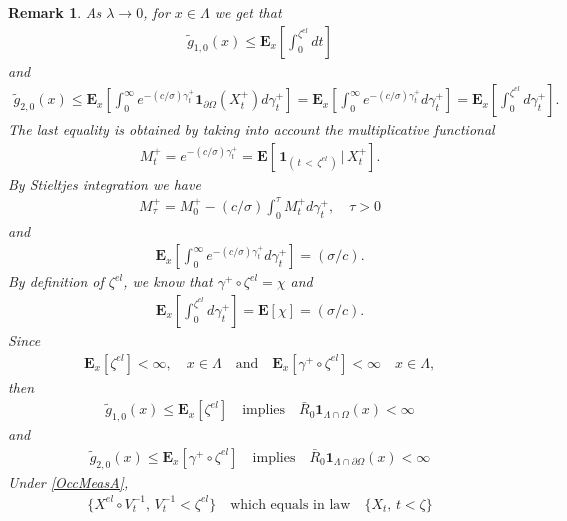 \documentclass[11pt,a4paper]{article}
\newtheorem{remark}{Remark}[section]
\begin{document}
\begin{remark}
As $\lambda \to 0$, for $x \in \Lambda$ we get that
\begin{align*}
\tilde{g}_{1, 0}(x) \leq \mathbf{E}_x \left[ \int_0^{\zeta^{el}} dt \right]
\end{align*}
and
\begin{align*}
\tilde{g}_{2, 0}(x) \leq \mathbf{E}_x\left[ \int_0^\infty e^{-(c/\sigma)\gamma^+_t} \mathbf{1}_{\partial \Omega} (X^+_t) d\gamma^+_t \right] = \mathbf{E}_x\left[ \int_0^\infty e^{-(c/\sigma)\gamma^+_t} d\gamma^+_t \right]  = \mathbf{E}_x\left[ \int_0^{\zeta^{el}} d\gamma^+_t \right].
\end{align*}
The last equality is obtained by taking into account the multiplicative functional 
\begin{align*}
M^+_t= e^{-(c/\sigma)\gamma^+_t} = \mathbf{E}[\, \mathbf{1}_{(\,t\, <\, \zeta^{el}\,)} \,| \, X^+_t].
\end{align*}
By Stieltjes integration we have
\begin{align*}
M^+_\tau = M^+_0 - (c/\sigma) \int_0^\tau M^+_t d\gamma^+_t, \quad \tau >0
\end{align*} 
and
\begin{align*}
\mathbf{E}_x\left[ \int_0^\infty e^{-(c/\sigma)\gamma^+_t} d\gamma^+_t \right] = (\sigma / c).
\end{align*} 
By definition of $\zeta^{el}$, we know that $\gamma^+ \circ \zeta^{el} = \chi$ and 
\begin{align*}
\mathbf{E}_x\left[ \int_0^{\zeta^{el}} d\gamma^+_t \right] = \mathbf{E}[\chi] = (\sigma/c).
\end{align*}
Since
\begin{align}
\mathbf{E}_x[\zeta^{el}] < \infty, \quad x \in \Lambda  \quad \textrm{and} \quad \mathbf{E}_x[\gamma^+ \circ \zeta^{el}] < \infty \quad x \in \Lambda,
\label{OccMeasA}
\end{align}
then 
\begin{align*}
\tilde{g}_{1, 0}(x) \leq \mathbf{E}_x[\zeta^{el}] \quad \textrm{implies} \quad \bar{R}_0 \mathbf{1}_{\Lambda \cap \Omega}(x) < \infty
\end{align*}
and
\begin{align*}
\tilde{g}_{2, 0}(x) \leq \mathbf{E}_x[\gamma^+ \circ \zeta^{el}] \quad \textrm{implies} \quad \bar{R}_0 \mathbf{1}_{\Lambda \cap \partial \Omega}(x) < \infty
\end{align*}
Under \eqref{OccMeasA}, 
\begin{align*}
\{X^{el} \circ V^{-1}_t,\, V^{-1}_t < \zeta^{el}\} \quad \textrm{which equals in law} \quad \{X_t,\, t < \zeta\}

\end{align*}
\end{remark}
\end{document}
